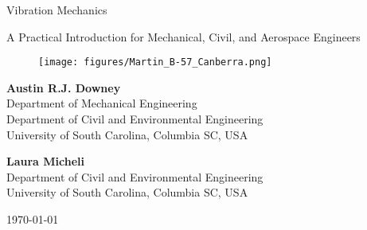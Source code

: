 \documentclass[12pt,letter]{article}
\begin{document}
\thispagestyle{empty}	

\begin{center}
	{\fontsize{50}{60}\selectfont Vibration Mechanics}
	
	\vspace{2cm}


	
	\begin{center}
	\begin{minipage}{0.75\textwidth}
		\centering
       	{\LARGE{} A Practical Introduction for Mechanical, Civil, and Aerospace Engineers}
	\end{minipage}
	\end{center}

	\vspace{2cm}
	
	\begin{figure}[H]
		\texttt{[image: figures/Martin\_B-57\_Canberra.png]}
		\label{fig:title_figure}
	\end{figure} 
	
	\vspace{3cm}
	
	\textbf{Austin R.J. Downey}\\ Department of Mechanical Engineering \\ Department of Civil and Environmental Engineering \\ University of South Carolina, Columbia SC, USA 
	
	\vspace{1cm}
	
	\textbf{Laura Micheli}\\ Department of Civil and Environmental Engineering \\ University of South Carolina, Columbia SC, USA 
	



	\vspace*{\fill}
	
	\today


\end{center}

\pagebreak

\pagebreak
\setcounter{page}{1}
\tableofcontents

\pagebreak
\end{document}
